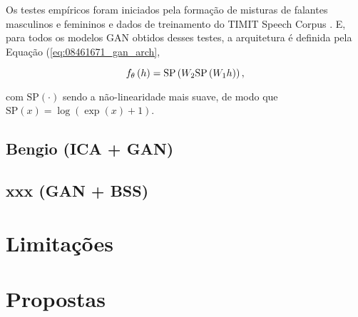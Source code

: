 Os testes empíricos foram iniciados pela formação de misturas de falantes masculinos e femininos e dados de treinamento do TIMIT Speech Corpus \citep{timit}. E, para todos os modelos GAN obtidos desses testes, a arquitetura é definida pela Equação (\ref{eq:08461671_gan_arch},

\begin{equation}
    f_{\theta}\left(h\right) = \text{SP}\left(W_{2}\text{SP}\left(W_{1}h\right)\right),
    \label{eq:08461671_gan_arch}
    \vspace{0.2cm}
\end{equation}

\noindent com $\text{SP}\left(\cdot\right)$ sendo a não-linearidade mais suave, de modo que $\text{SP}\left(x\right) = \log\left(\exp\left(x\right) +1 \right)$.



\subsection{Bengio (ICA + GAN)}
\label{subsec:gan_for_bss_ica_gan}



\subsection{xxx (GAN + BSS)}
\label{subsec:gan_for_bss_gan_bss}



\section{Limitações}
\label{sec:gan_for_bss_limitacoes}



\section{Propostas}
\label{sec:gan_for_bss_propositions}
